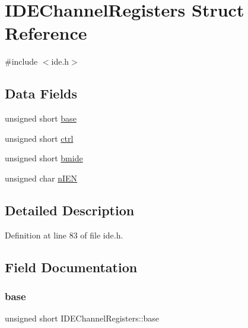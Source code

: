 \hypertarget{structIDEChannelRegisters}{}\section{I\+D\+E\+Channel\+Registers Struct Reference}
\label{structIDEChannelRegisters}


{\ttfamily \#include $<$ide.\+h$>$}

\subsection*{Data Fields}
\begin{DoxyCompactItemize}
\item 
unsigned short \hyperlink{structIDEChannelRegisters_a39be732a5e3e643508fc5bc3e0bfb4e8_a39be732a5e3e643508fc5bc3e0bfb4e8}{base}
\item 
unsigned short \hyperlink{structIDEChannelRegisters_aff63cdf64356750ad0c564fc7d6cd7b9_aff63cdf64356750ad0c564fc7d6cd7b9}{ctrl}
\item 
unsigned short \hyperlink{structIDEChannelRegisters_a037009656fd72b00bdd5aacd92a22f18_a037009656fd72b00bdd5aacd92a22f18}{bmide}
\item 
unsigned char \hyperlink{structIDEChannelRegisters_a23340aa271745fba054e2c26cf7b9a90_a23340aa271745fba054e2c26cf7b9a90}{n\+I\+EN}
\end{DoxyCompactItemize}


\subsection{Detailed Description}


Definition at line 83 of file ide.\+h.



\subsection{Field Documentation}
\mbox{\label{structIDEChannelRegisters_a39be732a5e3e643508fc5bc3e0bfb4e8_a39be732a5e3e643508fc5bc3e0bfb4e8}} 
\subsubsection{\texorpdfstring{base}{base}}
{\footnotesize\ttfamily unsigned short I\+D\+E\+Channel\+Registers\+::base}



